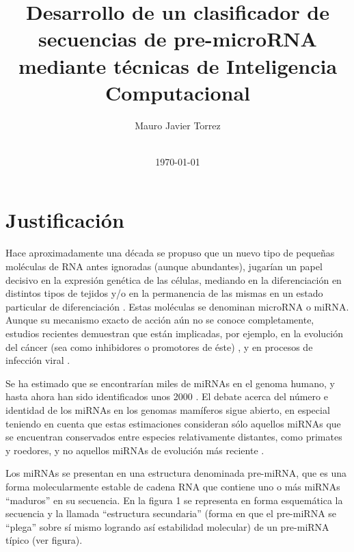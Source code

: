 \documentclass[bibliography=openstyle,DIV=12]{scrartcl}
\begin{document}
\begin{titlepage}
\titlehead{\center Universidad Nacional del Litoral\\
Facultad de Ingeniería y Ciencias Hídricas}
\subject{Ingeniería en Informática\\Propuesta de Proyecto Final de Carrera}
\title{Desarrollo de un clasificador de secuencias de pre-microRNA mediante
  técnicas de Inteligencia Computacional}
\author{Mauro Javier Torrez}
\publishers{\-\\[4em]{Director\\Dr. Diego H. Milone}\\[2em]
  {Asesora temática\\Dra. Georgina S. Stegmayer}}
\date{\-\\[2em]\today}
\maketitle
\end{titlepage}
%
\section{Justificación}
Hace aproximadamente una década se propuso que un nuevo tipo de pequeñas moléculas de RNA antes ignoradas (aunque abundantes), jugarían un papel decisivo en la expresión genética de las células, mediando en la diferenciación en distintos tipos de tejidos y/o en la permanencia de las mismas en un estado particular de diferenciación \cite{lee-mammal}. Estas moléculas se denominan microRNA o miRNA. Aunque su mecanismo exacto de acción aún no se conoce completamente, estudios recientes demuestran que están implicadas, por ejemplo, en la evolución del cáncer (sea como inhibidores o promotores de éste) \cite{aurora}, y en procesos de infección viral \cite{lecellier}.

Se ha estimado que se encontrarían miles de miRNAs en el genoma humano, y hasta ahora han sido identificados unos 2000 \cite{MIRBASE RELEASE? FECHA?, BATUWITA}\cite{mirbase1}\cite{mirbase2}\cite{mirbase3}. El debate acerca del número e identidad de los miRNAs en los genomas mamíferos sigue abierto, en especial teniendo en cuenta que estas estimaciones consideran sólo aquellos miRNAs que se encuentran conservados entre especies relativamente distantes, como primates y roedores, y no aquellos miRNAs de evolución más reciente \cite{SWEWR}.

Los miRNAs se presentan en una estructura denominada pre-miRNA, que es una forma molecularmente estable de cadena RNA que contiene uno o más miRNAs “maduros” en su secuencia. En la figura 1 se representa en forma esquemática la secuencia y la llamada “estructura secundaria” (forma en que el pre-miRNA se “plega” sobre sí mismo logrando así estabilidad molecular) de un pre-miRNA típico (ver figura). \cite{CITA}
\end{document}
